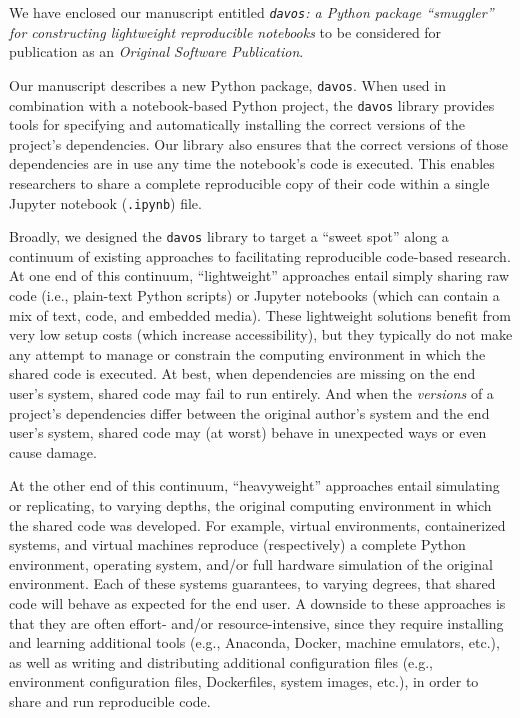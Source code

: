\documentclass[11pt,stdletter,orderfromtodate,sigleft]{newlfm}
\begin{document}
\begin{newlfm}

  We have enclosed our manuscript entitled \textit{\texttt{davos}: a
    Python package ``smuggler'' for constructing lightweight
    reproducible notebooks} to be considered for publication as
  an \textit{Original Software Publication}.

  Our manuscript describes a new Python package, \texttt{davos}.  When
  used in combination with a notebook-based Python project, the
  \texttt{davos} library provides tools for specifying and
  automatically installing the correct versions of the project's
  dependencies.  Our library also ensures that the correct versions of
  those dependencies are in use any time the notebook's code is
  executed.  This enables researchers to share a complete reproducible
  copy of their code within a single Jupyter notebook (\texttt{.ipynb}) file.

  Broadly, we designed the \texttt{davos} library to target a ``sweet
  spot'' along a continuum of existing approaches to facilitating reproducible
  code-based research.  At one end of this continuum, ``lightweight''
  approaches entail simply sharing raw code (i.e., plain-text Python
  scripts) or Jupyter notebooks (which can contain a mix
  of text, code, and embedded media).  These lightweight solutions
  benefit from very low setup costs (which increase accessibility),
  but they typically do not make any attempt to manage or constrain
  the computing environment in which the shared code is executed.
  At best, when dependencies are missing on the end user's system, shared code
 may fail to run entirely.  And when the \textit{versions} of a
 project's dependencies differ between the original author's system and
 the end user's system, shared code may (at worst) behave in
 unexpected ways or even cause damage.

 At the other end of this continuum, ``heavyweight'' approaches entail
 simulating or replicating, to varying depths, the original computing
 environment in which the shared code was developed.  For example,
 virtual environments, containerized systems, and virtual machines
 reproduce (respectively) a complete Python environment, operating system, and/or
 full hardware simulation of the original environment.  Each of these
 systems guarantees, to varying degrees, that shared code will behave
 as expected for the end user.  A downside to these approaches is that
 they are often effort- and/or resource-intensive, since they require
 installing and learning additional tools (e.g., Anaconda, Docker, machine
 emulators, etc.), as well as writing and distributing additional
 configuration files (e.g., environment configuration files,
 Dockerfiles, system images, etc.), in order to share and run reproducible code.


\end{newlfm}
\end{document}
